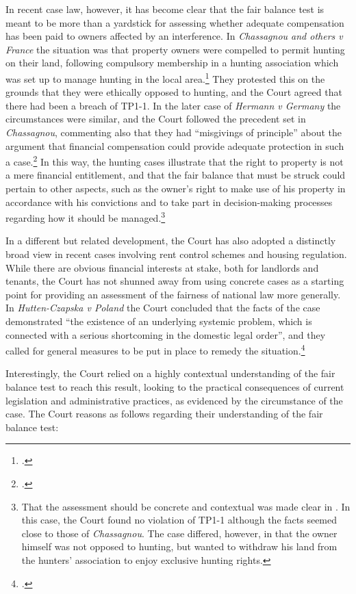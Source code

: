 In recent case law, however, it has become clear that the fair balance test is meant to be more than a yardstick for assessing whether adequate compensation has been paid to owners affected by an interference. In {\it Chassagnou and others v France} the situation was that property owners were compelled to permit hunting on their land, following compulsory membership in a hunting association which was set up to manage hunting in the local area.\footcite{chassagnou99} They protested this on the grounds that they were ethically opposed to hunting, and the Court agreed that there had been a breach of TP1-1.  In the later case of {\it Hermann v Germany} the circumstances were similar, and the Court followed the precedent set in {\it Chassagnou}, commenting also that they had ``misgivings of principle'' about the argument that financial compensation could provide adequate protection in such a case.\footcite[See][91]{hermann12}  In this way, the hunting cases illustrate that the right to property is not a mere financial entitlement, and that the fair balance that must be struck could pertain to other aspects, such as the owner's right to make use of his property in accordance with his convictions and to take part in decision-making processes regarding how it should be managed.\footnote{That the assessment should be concrete and contextual was made clear in \cite{chabauty12}. In this case, the Court found no violation of TP1-1 although the facts seemed close to those of {\it Chassagnou}. The case differed, however, in that the owner himself was not opposed to hunting, but wanted to withdraw his land from the hunters' association to enjoy exclusive hunting rights.}

In a different but related development, the Court has also adopted a distinctly broad view in recent cases involving rent control schemes and housing regulation. While there are obvious financial interests at stake, both for landlords and tenants, the Court has not shunned away from using concrete cases as a starting point for providing an assessment of the fairness of national law more generally. In {\it Hutten-Czapska v Poland} the Court concluded that the facts of the case demonstrated ``the existence of an underlying systemic problem, which is connected with a serious shortcoming in the domestic legal order'', and they called for general measures to be put in place to remedy the situation.\footcite[191]{hutten06}

Interestingly, the Court relied on a highly contextual understanding of the fair balance test to reach this result, looking to the practical consequences of current legislation and administrative practices, as evidenced by the circumstance of the case. The Court reasons as follows regarding their understanding of the fair balance test:

